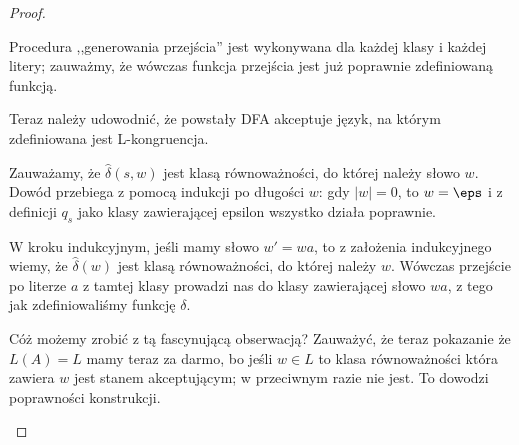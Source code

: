\begin{proof}
\begin{description}
        Procedura ,,generowania przejścia'' jest wykonywana dla każdej klasy i każdej litery; zauważmy, że wówczas funkcja przejścia jest już poprawnie zdefiniowaną funkcją. 
        
        Teraz należy udowodnić, że powstały DFA akceptuje język, na którym zdefiniowana jest L-kongruencja. 
        
        Zauważamy, że \(\hat\delta(s, w) \) jest klasą równoważności, do której należy słowo \(w\). Dowód przebiega z pomocą indukcji po długości \(w\): gdy \(|w| = 0\), to \( w = \eps \) i z definicji \(q_s\) jako klasy zawierającej epsilon wszystko działa poprawnie.
        
        W kroku indukcyjnym, jeśli mamy słowo \(w' = wa\), to z założenia indukcyjnego wiemy, że \(\hat\delta(w)\) jest klasą równoważności, do której należy \(w\). Wówczas przejście po literze \(a\) z tamtej klasy prowadzi nas do klasy zawierającej słowo \(wa\), z tego jak zdefiniowaliśmy funkcję \(\delta\). 
        
        Cóż możemy zrobić z tą fascynującą obserwacją? Zauważyć, że teraz pokazanie że \(L(A) = L\) mamy teraz za darmo, bo jeśli \(w \in L\) to klasa równoważności która zawiera \(w\) jest stanem akceptującym; w przeciwnym razie nie jest. To dowodzi poprawności konstrukcji. 
        
        
    \end{description}
\end{proof}
